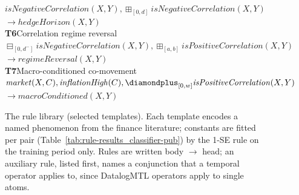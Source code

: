 \begin{figure}[t]
{\begin{minipage}{0.95\textwidth}
\hspace*{1.5em}\mbox{$\mathit{isNegativeCorrelation}(X,Y), \boxplus_{[0,d]} \mathit{isNegativeCorrelation}(X,Y)$}\\
\hspace*{1.5em}\hspace*{3em}\mbox{$\to \mathit{hedgeHorizon}(X,Y)$}\\[5pt]
\textbf{T6}\quad Correlation regime reversal~\cite{ang2002regimeshifts}\\
\hspace*{1.5em}\mbox{$\boxminus_{[0, d^{-}]}\mathit{isNegativeCorrelation}(X,Y), \boxplus_{[a,b]}\mathit{isPositiveCorrelation}(X,Y)$}\\
\hspace*{1.5em}\hspace*{3em}\mbox{$\to \mathit{regimeReversal}(X,Y)$}\\[5pt]
\textbf{T7}\quad Macro-conditioned co-movement~\cite{bekaert2013risk}\hspace{1em plus 1fill}{\footnotesize (fitted constants: $w$)}\\
\hspace*{1.5em}\mbox{$\mathit{market}(X,C), \mathit{inflationHigh}(C), \diamondplus_{[0,w]} \mathit{isPositiveCorrelation}(X,Y)$}\\
\hspace*{1.5em}\hspace*{3em}\mbox{$\to \mathit{macroConditioned}(X,Y)$}
\end{minipage}}
\caption{The rule library (selected templates). Each template encodes a named phenomenon from the finance literature; constants are fitted per pair (Table~\ref{tab:rule-results_classifier-pub}) by the 1-SE rule on the training period only. Rules are written body $\to$ head; an auxiliary rule, listed first, names a conjunction that a temporal operator applies to, since DatalogMTL operators apply to single atoms.}
\label{fig:rule-library-pub}
\end{figure}
